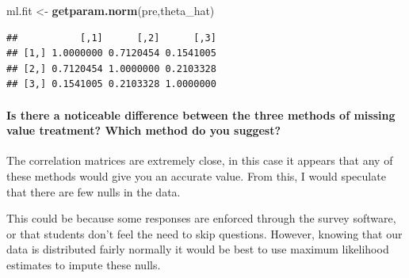 \documentclass[
]{article}
\newenvironment{Shaded}{\begin{snugshade}}{\end{snugshade}}
\newcommand{\KeywordTok}[1]{\textcolor[rgb]{0.13,0.29,0.53}{\textbf{#1}}}
\newcommand{\NormalTok}[1]{#1}
\newcommand{\OperatorTok}[1]{\textcolor[rgb]{0.81,0.36,0.00}{\textbf{#1}}}
\newcommand{\StringTok}[1]{\textcolor[rgb]{0.31,0.60,0.02}{#1}}
\begin{document}
\begin{Shaded}
\begin{Highlighting}[]
\NormalTok{ml.fit <-}\StringTok{ }\KeywordTok{getparam.norm}\NormalTok{(pre,theta_hat)}
\end{Highlighting}
\end{Shaded}

\begin{Shaded}
\end{Shaded}

\begin{verbatim}
##           [,1]      [,2]      [,3]
## [1,] 1.0000000 0.7120454 0.1541005
## [2,] 0.7120454 1.0000000 0.2103328
## [3,] 0.1541005 0.2103328 1.0000000
\end{verbatim}

\hypertarget{is-there-a-noticeable-difference-between-the-three-methods-of-missing-value-treatment-which-method-do-you-suggest}{%
\paragraph{Is there a noticeable difference between the three methods of
missing value treatment? Which method do you
suggest?}\label{is-there-a-noticeable-difference-between-the-three-methods-of-missing-value-treatment-which-method-do-you-suggest}}

The correlation matrices are extremely close, in this case it appears
that any of these methods would give you an accurate value. From this, I
would speculate that there are few nulls in the data.

This could be because some responses are enforced through the survey
software, or that students don't feel the need to skip questions.
However, knowing that our data is distributed fairly normally it would
be best to use maximum likelihood estimates to impute these nulls.
\end{document}
